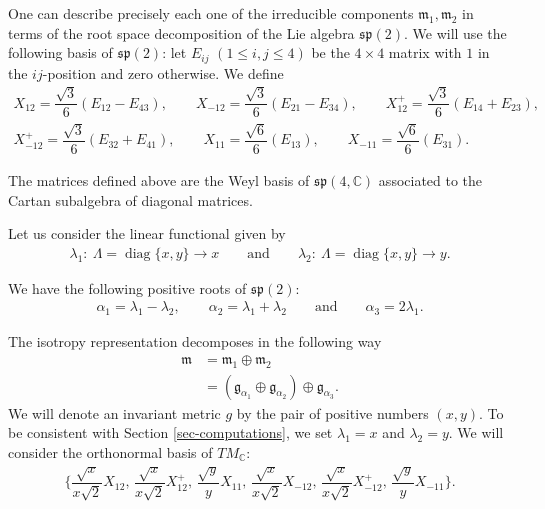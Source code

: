 \documentclass[10pt,a4paper]{amsart}
\numberwithin{equation}{section}
\DeclareMathOperator{\Diag}{diag}
\begin{document}
One can describe precisely each one of the irreducible components $\mathfrak{m}_1, \mathfrak{m}_2$ in terms of the root space decomposition of the Lie algebra $\mathfrak{sp}(2)$. We will use the following basis of $\mathfrak{sp}(2)$: let $E_{ij}$ $(1 \leq i,j \leq 4)$ be the $4 \times 4$ matrix with $1$ in the $ij$-position and zero otherwise. We define
\begin{gather*}
X_{12} = \dfrac{\sqrt{3}}{6}(E_{12}-E_{43}), \qquad
X_{-12} = \dfrac{\sqrt{3}}{6}(E_{21} - E_{34}), \qquad
X_{12}^{+} = \dfrac{\sqrt{3}}{6}(E_{14}+E_{23}),
\\
X_{-12}^{+} = \dfrac{\sqrt{3}}{6}(E_{32}+E_{41}), \qquad
X_{11} = \dfrac{\sqrt{6}}{6}(E_{13}), \qquad
X_{-11} = \dfrac{\sqrt{6}}{6}(E_{31}).
\end{gather*}

The matrices defined above are the Weyl basis of $\mathfrak{sp}(4,\mathbb{C})$ associated to the Cartan subalgebra of diagonal matrices.

Let us consider the linear functional given by
\begin{gather*}
\lambda_{1}\colon\ \Lambda=\Diag\{x,y\}\longrightarrow x \qquad\text{and}\qquad
\lambda_{2}\colon\ \Lambda=\Diag\{x,y\}\longrightarrow y.
\end{gather*}

We have the following positive roots of $\mathfrak{sp}(2)$:
\begin{gather*}
\alpha_{1}=\lambda_{1}-\lambda_{2}, \qquad \alpha_{2}=\lambda_{1}+\lambda_{2} \qquad \text{and} \qquad \alpha_{3}=2\lambda_{1}.
\end{gather*}

The isotropy representation decomposes in the following way
\begin{align*}
\mathfrak{m}&=\mathfrak{m}_{1}\oplus \mathfrak{m}_{2}
\\
&=(\mathfrak{g}_{\alpha_{1}}\oplus \mathfrak{g}_{\alpha_{2}}) \oplus \mathfrak{g}_{\alpha_{3}}.
\end{align*}
We will denote an invariant metric $g$ by the pair of positive numbers $(x,y)$. To be consistent with Section \ref{sec-computations}, we set $\lambda_{1}=x$ and $\lambda_{2}=y$. We will consider the orthonormal basis of $TM_{\mathbb{C}}$:
\begin{gather*}
\bigg\{\dfrac{\sqrt{x}}{x\sqrt{2}}X_{12}, \, \dfrac{\sqrt{x}}{x\sqrt{2}}X_{12}^{+},\,\dfrac{\sqrt{y}}{y}X_{11},\,\dfrac{\sqrt{x}}{x\sqrt{2}}X_{-12},\, \dfrac{\sqrt{x}}{x\sqrt{2}}X_{-12}^{+},\,\dfrac{\sqrt{y}}{y}X_{-11}\bigg\}.
\end{gather*}
\end{document}
